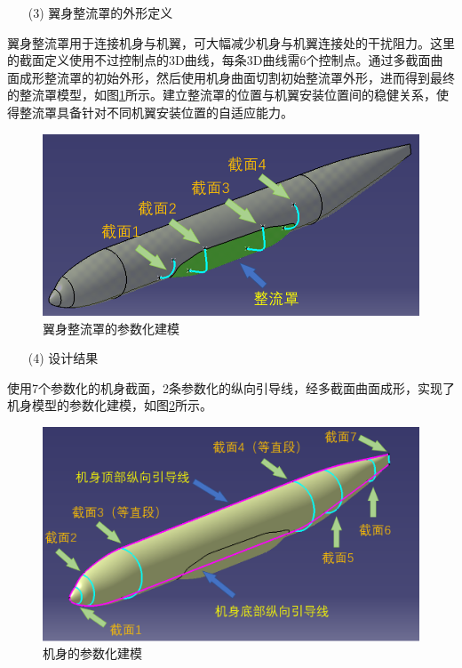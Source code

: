 \documentclass[12pt,a4paper]{report}
\begin{document}
\begin{itemize}
    \item[(3)] 翼身整流罩的外形定义
\end{itemize}

翼身整流罩用于连接机身与机翼，可大幅减少机身与机翼连接处的干扰阻力。这里的截面定义使用不过控制点的3D曲线，每条3D曲线需6个控制点。通过多截面曲面成形整流罩的初始外形，然后使用机身曲面切割初始整流罩外形，进而得到最终的整流罩模型，如图\ref{fig:Fairing}所示。建立整流罩的位置与机翼安装位置间的稳健关系，使得整流罩具备针对不同机翼安装位置的自适应能力。

\begin{figure}[hbt!]
\centering
\includegraphics[width=.8\textwidth]{Fairing.PNG}
\caption{翼身整流罩的参数化建模}
\label{fig:Fairing}
\end{figure}

\begin{itemize}
    \item[(4)] 设计结果
\end{itemize}

使用7个参数化的机身截面，2条参数化的纵向引导线，经多截面曲面成形，实现了机身模型的参数化建模，如图\ref{fig:FuselageModel}所示。

\begin{figure}[hbt!]
\centering
\includegraphics[width=.8\textwidth]{FuselageModel.PNG}
\caption{机身的参数化建模}
\label{fig:FuselageModel}
\end{figure}
\end{document}

